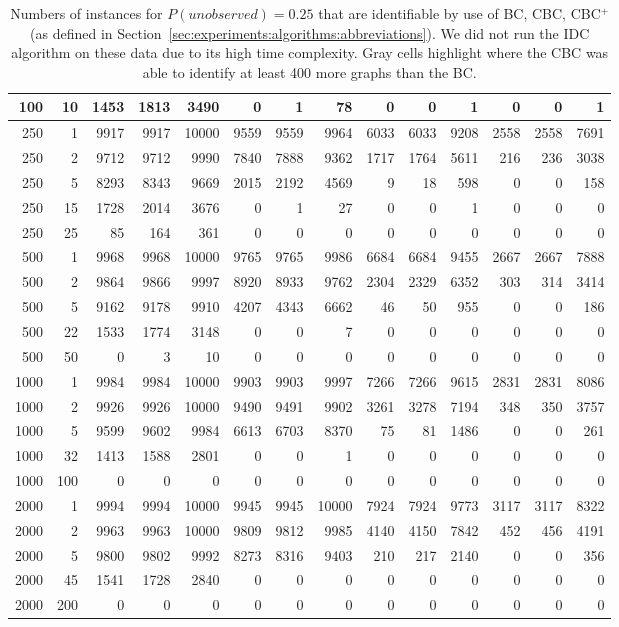 \begin{table}
\begin{center}
\begin{tabular}{|rr | rrr| rrr| rrr| rrr|}
100&10&
1453&1813&3490&0&1&78&0&0&1&0&0&1\\
\hline
250&1&
9917&9917&10000&9559&9559&9964&6033&6033&9208&2558&2558&7691\\
250&2&
9712&9712&9990&7840&7888&9362&1717&1764&5611&216&236&3038\\
250&5&
8293&8343&9669&2015&2192&4569&9&18&598&0&0&158\\
250&15&
1728&2014&3676&          0&1&27&        0&0&1&          0&0&0\\
250&25&
85&164&361&0&0&0&0&0&0&0&0&0\\
\hline
500&1&
9968&9968&10000&9765&9765&9986&6684&6684&9455&2667&2667&7888\\
500&2&
9864&9866&9997&8920&8933&9762&2304&2329&6352&303&314&3414\\
500&5&
9162&9178&9910&4207&4343&6662&46&50&955&0&0&186\\
500&22&
1533&1774&3148&0&0&7&0&0&0&0&0&0\\
500&50&
0&3&10&0&0&0&0&0&0&0&0&0\\
\hline
1000&1&
9984&9984&10000&9903&9903&9997&7266&7266&9615&2831&2831&8086\\
1000&2&
9926&9926&10000&9490&9491&9902&3261&3278&7194&348&350&3757\\
1000&5&
9599&9602&9984&6613&6703&8370&75&81&1486&0&0&261\\
1000&32&
1413&1588&2801&0&0&1&0&0&0&0&0&0\\
1000&100&
0&0&0&0&0&0&0&0&0&0&0&0\\
\hline
2000&1&
9994&9994&10000&9945&9945&10000&7924&7924&9773&3117&3117&8322\\
2000&2&
9963&9963&10000&9809&9812&9985&4140&4150&7842&452&456&4191\\
2000&5&
9800&9802&9992&8273&8316&9403&210&217&2140&0&0&356\\
2000&45&
1541&1728&2840&0&0&0&0&0&0&0&0&0\\
2000&200&
0&0&0&0&0&0&0&0&0&0&0&0\\
\hline\end{tabular}
  \end{center}\vspace*{-3mm}
  \caption{Numbers of instances for $P(\textit{unobserved}) = 0.25$ that are identifiable
  by use of BC, CBC, CBC$^+$ (as defined in Section~\ref{sec:experiments:algorithms:abbreviations}). 
We did not run the IDC algorithm on these data due to its high time complexity.   
Gray cells highlight where the CBC was able to identify at least 400 more graphs than the BC.
}\label{table:global:stat:unobs0.25:count}
  \end{table}
